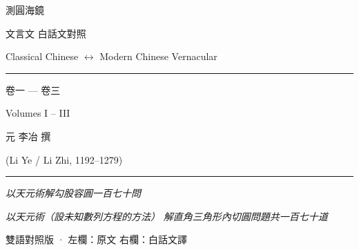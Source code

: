 \documentclass[11pt,a4paper]{article}
\begin{document}
\begin{titlepage}
\centering
\vspace*{2cm}

{\fontsize{36}{44}\selectfont{}\color{titlecolor}
測圓海鏡}

\vspace{0.6cm}

{\fontsize{14}{18}\selectfont\color{sectioncolor}
文言文 \raisebox{0.1ex}{\textcolor{rulecolor}{$\longleftrightarrow$}} 白話文對照}

\vspace{0.3cm}

{\small\color{rulecolor}
Classical Chinese $\longleftrightarrow$ Modern Chinese Vernacular}

\vspace{0.5cm}

{\color{rulecolor}\rule{0.6\textwidth}{0.4pt}}

\vspace{0.8cm}

{\LARGE 卷一 — 卷三}

{\large Volumes I – III}

\vspace{1.5cm}

{\large\color{sectioncolor}
元 \quad 李冶 \quad 撰}

\vspace{0.3cm}

{\normalsize\color{sectioncolor}
(Li Ye / Li Zhi, 1192–1279)}

\vspace{2cm}

{\color{rulecolor}\rule{0.4\textwidth}{0.4pt}}

\vspace{1cm}

{\normalsize
\textit{以天元術解勾股容圓一百七十問}}

\vspace{0.3cm}

{\small\color{notecolor}
\textit{以天元術（設未知數列方程的方法）}\newline
\textit{解直角三角形內切圓問題共一百七十道}}

\vfill

{\small
雙語對照版 · 左欄：原文 \quad 右欄：白話文譯}

\end{titlepage}

\tableofcontents
\newpage
\end{document}
